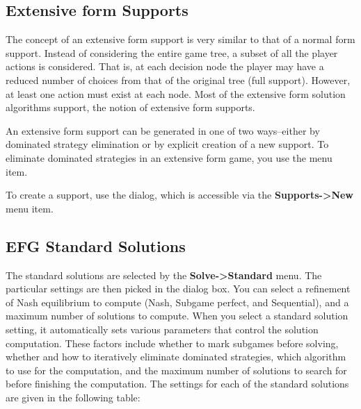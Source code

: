 \subsection{Extensive form Supports}
The concept of an extensive form support is very similar to that of a
normal form support.  Instead of considering the entire game tree, a
subset of all the player actions is considered.  That is, at each
decision node the player may have a reduced number of choices from
that of the original tree (full support).  However, at least one
action must exist at each node.  Most of the extensive form solution
algorithms support, the notion of extensive form supports.

An extensive form support can be generated in one of two ways--either by 
dominated strategy elimination or by explicit creation of a new support.  
To eliminate dominated strategies in an extensive form game, you use the 
 menu item.  

To create a support, use the  
dialog, which is accessible via the {\bf Supports->New} menu item.


\subsection{EFG Standard Solutions}\label{EFGStandardSolutions}
The standard solutions are selected by the {\bf Solve->Standard} menu.
The particular settings are then picked in the dialog box.  You can
select a refinement of Nash equilibrium to compute (Nash, Subgame
perfect, and Sequential), and a maximum number of solutions to
compute.  When you select a standard solution setting, it
automatically sets various parameters that control the solution
computation.  These factors include whether to mark subgames before
solving, whether and how to iteratively eliminate dominated
strategies, which algorithm to use for the computation, and the
maximum number of solutions to search for before finishing the
computation.  The settings for each of the standard solutions are
given in the following table:

